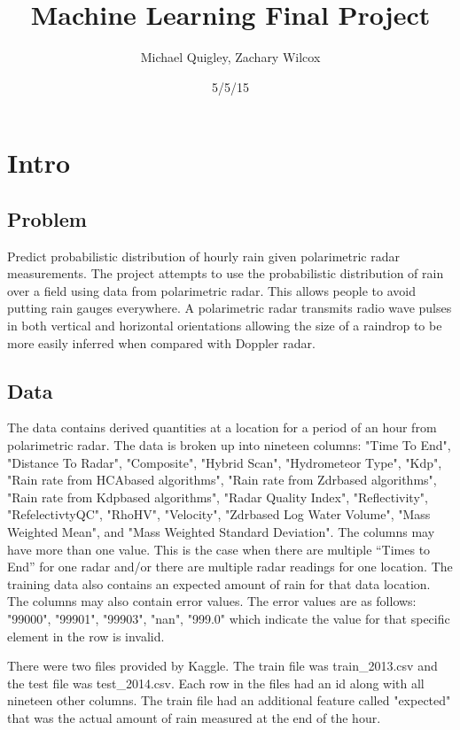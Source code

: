 \documentclass[pdftex,a4paper,12pt]{article}
\title{Machine Learning Final Project}
\author{Michael Quigley, Zachary Wilcox}
\date{5/5/15}
\begin{document}
\maketitle
\section{Intro}
\subsection{Problem}
Predict probabilistic distribution of hourly rain given polarimetric radar measurements.
The project attempts to use the probabilistic distribution of rain over a field using data from
polarimetric radar. This allows people to avoid putting rain gauges everywhere. A polarimetric
radar transmits radio wave pulses in both vertical and horizontal orientations allowing the size
of a raindrop to be more easily inferred when compared with Doppler radar.
\subsection{Data}
The data contains derived quantities at a location for a period of an hour from polarimetric
radar. The data is broken up into nineteen columns: "Time To End", "Distance To Radar",
"Composite", "Hybrid Scan", "Hydrometeor Type", "Kdp", "Rain rate from HCAbased
algorithms", "Rain rate from Zdrbased
algorithms", "Rain rate from Kdpbased
algorithms",
"Radar Quality Index", "Reflectivity", "RefelectivtyQC", "RhoHV", "Velocity", "Zdrbased
Log
Water Volume", "Mass Weighted Mean", and "Mass Weighted Standard Deviation".
The columns may have more than one value. This is the case when there are multiple “Times
to End” for one radar and/or there are multiple radar readings for one location. The training
data also contains an expected amount of rain for that data location. The columns may also
contain error values. The error values are as follows: "99000",
"99901",
"99903",
"nan",
"999.0" which indicate the value for that specific element in the row is invalid.




There were two files provided by Kaggle. The train file was train\_2013.csv and the test file was test\_2014.csv. Each row in the files had an id along with all nineteen other columns. The train file had an additional feature called "expected" that was the actual amount of rain measured at the end of the hour.
\end{document}
